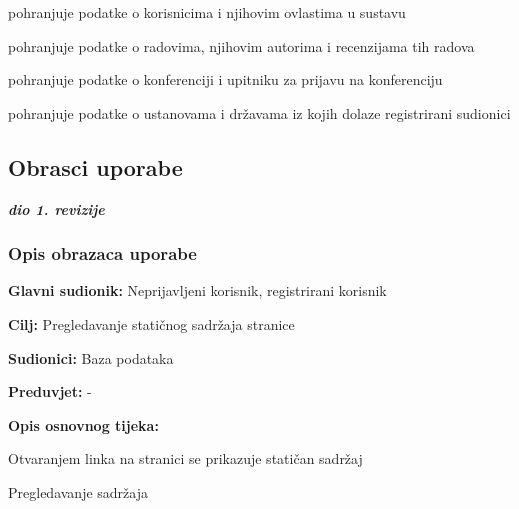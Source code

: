 \begin{packed_enum}
\begin{packed_enum}
\begin{packed_enum}
					\end{packed_enum}
				\end{packed_enum}


				\item {}

				\begin{packed_enum}

					\item pohranjuje podatke o korisnicima i njihovim ovlastima u sustavu
					\item pohranjuje podatke o radovima, njihovim autorima i recenzijama tih radova
					\item pohranjuje podatke o konferenciji i upitniku za prijavu na konferenciju
					\item pohranjuje podatke o ustanovama i državama iz kojih dolaze registrirani sudionici

				\end{packed_enum}
					
			\end{packed_enum}
			
			\eject 
			
			
				
			\subsection{Obrasci uporabe}
				
				\textbf{\textit{dio 1. revizije}}
				
				\subsubsection{Opis obrazaca uporabe}
					
					\noindent {}
					\begin{packed_item}
	
						\item \textbf{Glavni sudionik: } Neprijavljeni korisnik, registrirani korisnik
						\item  \textbf{Cilj:} Pregledavanje statičnog sadržaja stranice
						\item  \textbf{Sudionici:} Baza podataka
						\item  \textbf{Preduvjet:} -
						\item  \textbf{Opis osnovnog tijeka:}
						
						\item[] \begin{packed_enum}
	
							\item Otvaranjem linka na stranici se prikazuje statičan sadržaj
							\item Pregledavanje sadržaja
						\end{packed_enum}
						

					\end{packed_item}

